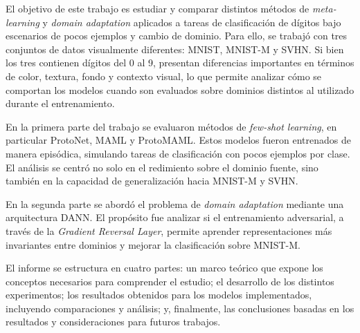 El objetivo de este trabajo es estudiar y comparar distintos métodos de \textit{meta-learning} y \textit{domain adaptation} aplicados a tareas de clasificación de dígitos bajo escenarios de pocos ejemplos y cambio de dominio. Para ello, se trabajó con tres conjuntos de datos visualmente diferentes: MNIST, MNIST-M y SVHN. Si bien los tres contienen dígitos del 0 al 9, presentan diferencias importantes en términos de color, textura, fondo y contexto visual, lo que permite analizar cómo se comportan los modelos cuando son evaluados sobre dominios distintos al utilizado durante el entrenamiento.

En la primera parte del trabajo se evaluaron métodos de \textit{few-shot learning}, en particular ProtoNet, MAML y ProtoMAML. Estos modelos fueron entrenados de manera episódica, simulando tareas de clasificación con pocos ejemplos por clase. El análisis se centró no solo en el redimiento sobre el dominio fuente, sino también en la capacidad de generalización hacia MNIST-M y SVHN.

En la segunda parte se abordó el problema de \textit{domain adaptation} mediante una arquitectura DANN. El propósito fue analizar si el entrenamiento adversarial, a través de la \textit{Gradient Reversal Layer}, permite aprender representaciones más invariantes entre dominios y mejorar la clasificación sobre MNIST-M.

El informe se estructura en cuatro partes: un marco teórico que expone los conceptos necesarios para comprender el estudio; el desarrollo de los distintos experimentos; los resultados obtenidos para los modelos implementados, incluyendo comparaciones y análisis; y, finalmente, las conclusiones basadas en los resultados y consideraciones para futuros trabajos.

